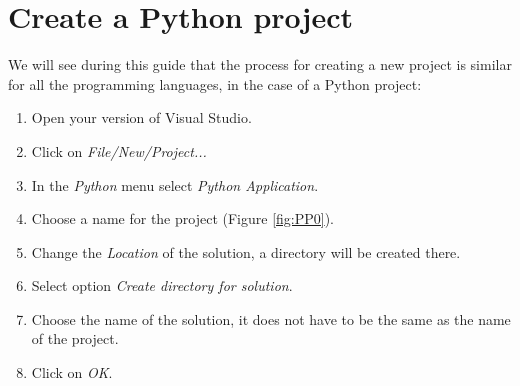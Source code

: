 %
%


    
    \section{Create a Python project}

We will see during this guide that the process for creating a new project is similar for all the programming languages, in the case of a Python project:

\begin{enumerate}
	\item Open your version of Visual Studio.
	\item Click on \textit{File/New/Project...}
	\item In the \textit{Python} menu select \textit{Python Application}.
	\item Choose a name for the project (Figure \ref{fig:PP0}).
    \item Change the \textit{Location} of the solution, a directory will be created there.
	\item Select option \textit{Create directory for solution}.
	\item Choose the name of the solution, it does not have to be the same as the name of the project.	
	\item Click on \textit{OK}.
\end{enumerate}

